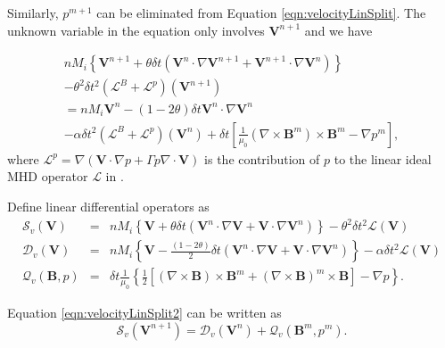 \documentclass[11pt]{article}  %
\begin{document}
Similarly, $p^{m+1}$ can be eliminated from Equation \ref{eqn:velocityLinSplit}. The unknown variable in the equation only involves $\mathbf{V}^{n+1}$ and we have

\begin{eqnarray}
nM_i \left\{ \mathbf{V}^{n+1}   +\theta \delta t  (\mathbf{V}^n \cdot \nabla \mathbf{V}^{n+1} + \mathbf{V}^{n+1} \cdot\nabla \mathbf{V}^{n})  \right\}     \nonumber \\
   -  \theta^2 \delta t^2 (\mathcal{L}^B+\mathcal{L}^{p})(\mathbf{V}^{n+1})   \nonumber \\
      = nM_i  \mathbf{V}^{n}  - (1-2 \theta) \delta t  \mathbf{V}^n \cdot \nabla \mathbf{V}^{n}
    \nonumber \\
 -\alpha \delta t^2 (\mathcal{L}^{B}+\mathcal{L}^{p})(\mathbf{V}^{n})  + \delta t  \left[ \frac{1}{\mu_0}(\nabla \times \mathbf{B}^m)  \times \mathbf{B}^m  - \nabla p ^m \right], \label{eqn:velocityLinSplit2}
\end{eqnarray}
where $\mathcal{L}^{p} = \nabla (\mathbf{V} \cdot \nabla p + \Gamma p \nabla \cdot \mathbf{V})$ is  the contribution of $p$ to the linear ideal MHD operator  $\mathcal{L}$  in \cite{ferraro2009calculations}.

Define linear differential operators as
\begin{subequations} 
\begin{eqnarray}
\mathcal{S}_v (\mathbf{V})&=& nM_i \left\{ \mathbf{V}  +\theta \delta t  (\mathbf{V}^n \cdot \nabla \mathbf{V} + \mathbf{V}\cdot\nabla \mathbf{V}^{n})  \right\}  
   -  \theta^2 \delta t^2 \mathcal{L}(\mathbf{V})  \\
\mathcal{D}_v (\mathbf{V})&=&  nM_i  \left\{ \mathbf{V}  - \frac{(1-2 \theta)}{2} \delta t ( \mathbf{V}^n \cdot \nabla \mathbf{V} +  \mathbf{V} \cdot \nabla \mathbf{V}^n ) \right\}  
 -\alpha \delta t^2 \mathcal{L}(\mathbf{V})  \\
 \mathcal{Q}_v (\mathbf{B}, p)&=& \delta t\frac{1}{\mu_0} \left\{\frac{1}{2} \left[(\nabla \times \mathbf{B})  \times \mathbf{B}^m + (\nabla \times \mathbf{B})^m  \times \mathbf{B}\right] - \nabla p \right\}.
\end{eqnarray}
\end{subequations}

Equation \ref{eqn:velocityLinSplit2} can be written as
\begin{equation}
\mathcal{S}_v (\mathbf{V}^{n+1}) = \mathcal{D}_v (\mathbf{V}^{n}) + \mathcal{Q}_v (\mathbf{B}^{m}, p^m).
\end{equation}
\end{document}
